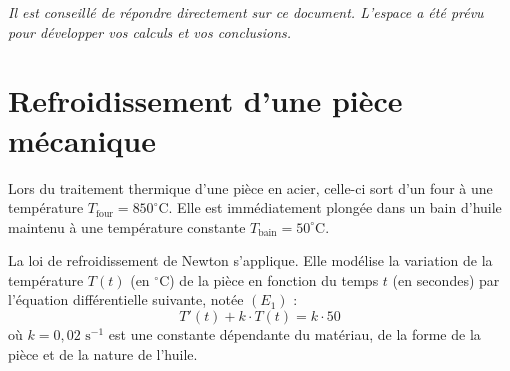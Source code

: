 \documentclass[a4paper,11pt]{article}
\begin{document}
\vspace{1cm}

\textit{Il est conseillé de répondre directement sur ce document. L'espace a été prévu pour développer vos calculs et vos conclusions.}

\newpage

\section{Refroidissement d'une pièce mécanique}

Lors du traitement thermique d'une pièce en acier, celle-ci sort d'un four à une température $T_{\text{four}} = 850^{\circ}\text{C}$. Elle est immédiatement plongée dans un bain d'huile maintenu à une température constante $T_{\text{bain}} = 50^{\circ}\text{C}$.

La loi de refroidissement de Newton s'applique. Elle modélise la variation de la température $T(t)$ (en $^{\circ}\text{C}$) de la pièce en fonction du temps $t$ (en secondes) par l'équation différentielle suivante, notée $(E_1)$ :
\[
T'(t) + k \cdot T(t) = k \cdot 50
\]
où $k = 0,02 \text{ s}^{-1}$ est une constante dépendante du matériau, de la forme de la pièce et de la nature de l'huile.
\end{document}
